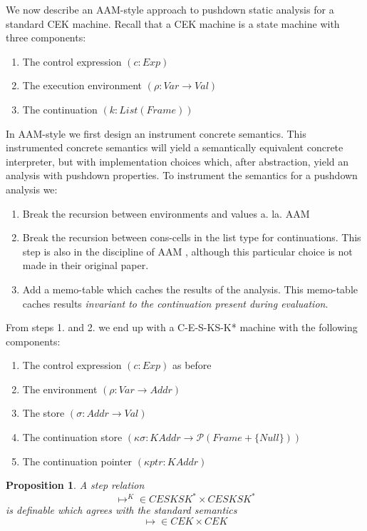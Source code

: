\documentclass[10pt,letter,english]{article}
\newtheorem{proposition}[theorem]{Proposition}
\begin{document}
We now describe an AAM-style approach to pushdown static analysis for a standard CEK machine.
%
Recall that a CEK machine is a state machine with three components:
%
\begin{enumerate}
\item The control expression $(c : Exp)$
\item The execution environment $(\rho : Var \rightarrow Val)$
\item The continuation $(k : List(Frame))$
\end{enumerate}
%
In AAM-style we first design an instrument concrete semantics.
%
This instrumented concrete semantics will yield a semantically equivalent
concrete interpreter, but with implementation choices which, after abstraction,
yield an analysis with pushdown properties.
%
To instrument the semantics for a pushdown analysis we:
\begin{enumerate}
\item Break the recursion between environments and values a. la. AAM \cite{aam}
\item Break the recursion between cons-cells in the list type for continuations.
%
This step is also in the discipline of AAM \cite{aam}, although this particular
choice is not made in their original paper.
%
\item Add a memo-table which caches the results of the analysis.
%
This memo-table caches results \emph{invariant to the continuation present during evaluation}.
\end{enumerate}

From steps 1. and 2. we end up with a C-E-S-KS-K* machine with the following components:
\begin{enumerate}
\item The control expression $(c : Exp)$ as before
\item The environment $(\rho : Var \rightarrow Addr)$
\item The store $(\sigma : Addr \rightarrow Val)$
\item The continuation store $(\kappa\sigma : KAddr \rightarrow \mathcal{P}(Frame + \{Null\}))$
\item The continuation pointer $(\kappa{}ptr : KAddr)$
\end{enumerate}

\begin{proposition}
A step relation
\begin{equation*}
\mapsto^{K} \in CESKSK^* \times CESKSK^* 
\end{equation*}
is definable which agrees with the standard semantics
\begin{equation*}
\mapsto \in CEK \times CEK 
\end{equation*}
\end{proposition}
\end{document}
